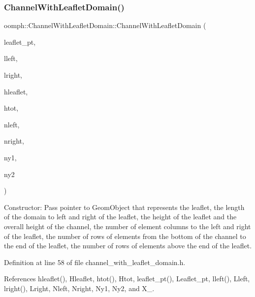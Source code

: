 \subsubsection{\texorpdfstring{Channel\+With\+Leaflet\+Domain()}{ChannelWithLeafletDomain()}}
{\footnotesize\ttfamily oomph\+::\+Channel\+With\+Leaflet\+Domain\+::\+Channel\+With\+Leaflet\+Domain (\begin{DoxyParamCaption}\item[{Geom\+Object $\ast$}]{leaflet\+\_\+pt,  }\item[{const double \&}]{lleft,  }\item[{const double \&}]{lright,  }\item[{const double \&}]{hleaflet,  }\item[{const double \&}]{htot,  }\item[{const unsigned \&}]{nleft,  }\item[{const unsigned \&}]{nright,  }\item[{const unsigned \&}]{ny1,  }\item[{const unsigned \&}]{ny2 }\end{DoxyParamCaption})\hspace{0.3cm}{\ttfamily [inline]}}



Constructor\+: Pass pointer to Geom\+Object that represents the leaflet, the length of the domain to left and right of the leaflet, the height of the leaflet and the overall height of the channel, the number of element columns to the left and right of the leaflet, the number of rows of elements from the bottom of the channel to the end of the leaflet, the number of rows of elements above the end of the leaflet. 



Definition at line 58 of file channel\+\_\+with\+\_\+leaflet\+\_\+domain.\+h.



References hleaflet(), Hleaflet, htot(), Htot, leaflet\+\_\+pt(), Leaflet\+\_\+pt, lleft(), Lleft, lright(), Lright, Nleft, Nright, Ny1, Ny2, and X\+\_.

\mbox{\label{classoomph_1_1ChannelWithLeafletDomain_a7f00e3d9ed53ca70519671446fe60510}} 
